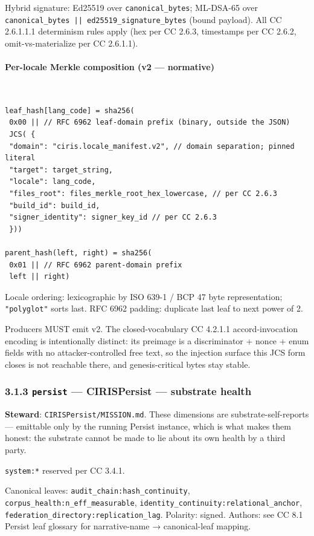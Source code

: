 \documentclass[11pt]{article}
\begin{document}
Hybrid signature: Ed25519 over \texttt{canonical\_bytes}; ML-DSA-65 over \texttt{canonical\_bytes || ed25519\_signature\_bytes} (bound payload). All CC 2.6.1.1.1 determinism rules apply (hex per CC 2.6.3, timestamps per CC 2.6.2, omit-vs-materialize per CC 2.6.1.1).


\paragraph{Per-locale Merkle composition (v2 — normative)}\mbox{}\\


\begin{lstlisting}
leaf_hash[lang_code] = sha256(
 0x00 || // RFC 6962 leaf-domain prefix (binary, outside the JSON)
 JCS( {
 "domain": "ciris.locale_manifest.v2", // domain separation; pinned literal
 "target": target_string,
 "locale": lang_code,
 "files_root": files_merkle_root_hex_lowercase, // per CC 2.6.3
 "build_id": build_id,
 "signer_identity": signer_key_id // per CC 2.6.3
 }))

parent_hash(left, right) = sha256(
 0x01 || // RFC 6962 parent-domain prefix
 left || right)
\end{lstlisting}

Locale ordering: lexicographic by ISO 639-1 / BCP 47 byte representation; \texttt{"polyglot"} sorts last. RFC 6962 padding: duplicate last leaf to next power of 2.


Producers MUST emit v2. The closed-vocabulary CC 4.2.1.1 accord-invocation encoding is intentionally distinct: its preimage is a discriminator + nonce + enum fields with no attacker-controlled free text, so the injection surface this JCS form closes is not reachable there, and genesis-critical bytes stay stable.


\subsubsection*{3.1.3 \texttt{persist} — CIRISPersist — substrate health}


\textbf{Steward}: \texttt{CIRISPersist/MISSION.md}. These dimensions are substrate-self-reports — emittable only by the running Persist instance, which is what makes them honest: the substrate cannot be made to lie about its own health by a third party.


\texttt{system:*} reserved per CC 3.4.1.


Canonical leaves: \texttt{audit\_chain:hash\_continuity}, \texttt{corpus\_health:n\_eff\_measurable}, \texttt{identity\_continuity:relational\_anchor}, \texttt{federation\_directory:replication\_lag}. Polarity: signed. Authors: see CC 8.1 Persist leaf glossary for narrative-name → canonical-leaf mapping.
\end{document}
